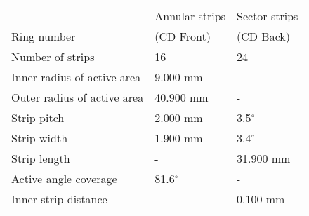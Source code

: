 \begin{tabular}{lll}
\hline
                            & Annular strips & Sector strips \\
Ring number                 & (CD Front)     & (CD Back)     \\
\hline
Number of strips            & 16             & 24            \\
Inner radius of active area &  9.000 mm      & -             \\
Outer radius of active area & 40.900 mm      & -             \\
Strip pitch                 &  2.000 mm      & 3.5$^\circ$   \\
Strip width                 &  1.900 mm      & 3.4$^\circ$   \\
Strip length                &  -             & 31.900 mm     \\
Active angle coverage       & 81.6$^\circ$   & -             \\
Inner strip distance        &  -             & 0.100 mm      \\
\hline
\end{tabular}